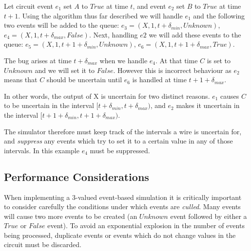 Let circuit event $e_1$ set $A$ to $True$ at time $t$, and event $e_2$ set $B$ to $True$ at time $t + 1$. Using the algorithm thus far described we will handle $e_1$ and the following two events will be added to the queue: $e_3 = (X, 1, t + \delta_{min}, Unknown)$, $e_4 = (X, 1, t + \delta_{max}, False)$. Next, handling $e2$ we will add these events to the queue: $e_5 = (X, 1, t + 1 + \delta_{min}, Unknown)$, $e_6 = (X, 1, t + 1 + \delta_{max}, True)$.

The bug arises at time $t + \delta_{max}$ when we handle $e_4$. At that time $C$ is set to $Unknown$ and we will set it to $False$. However this is incorrect behaviour as $e_2$ means that $C$ should be uncertain until $e_6$ is handled at time $t + 1 + \delta_{max}$.

In other words, the output of X is uncertain for two distinct reasons. $e_1$ causes $C$ to be uncertain in the interval $[t + \delta_{min}, t + \delta_{max})$, and $e_2$ makes it uncertain in the interval $[t + 1 +  \delta_{min}, t + 1 + \delta_{max})$.

The simulator therefore must keep track of the intervals a wire is uncertain for, and \textit{suppress} any events which try to set it to a certain value in any of those intervals. In this example $e_4$ must be suppressed.

\subsection{Performance Considerations}
When implementing a 3-valued event-based simulation it is critically important to consider carefully the conditions under which events are \textit{culled}. Many events will cause two more events to be created (an $Unknown$ event followed by either a $True$ or $False$ event). To avoid an exponential explosion in the number of events being processed, duplicate events or events which do not change values in the circuit must be discarded.